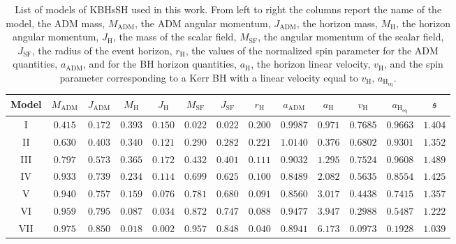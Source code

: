 \documentclass[twocolumn,aps,showpacs,showkeys,prd,superscriptaddress,byrevtex, amsmath]{revtex4-1}
\begin{document}
\begin{table}
\caption{List of models of KBHsSH used in this work. From left to right the columns report the name of the model, the ADM mass, $M_{\mathrm{ADM}}$, the ADM angular momentum, $J_{\mathrm{ADM}}$, the horizon mass, $M_{\mathrm{H}}$, the horizon angular momentum, $J_{\mathrm{H}}$, the mass of the scalar field, $M_{\mathrm{SF}}$, the angular momentum of the scalar field, $J_{\mathrm{SF}}$, the radius of the event horizon, $r_{\mathrm{H}}$, the values of the normalized spin parameter for the ADM quantities, $a_{\mathrm{ADM}}$, and for the BH horizon quantities, $a_{\mathrm{H}}$, the horizon linear velocity, $v_{\mathrm{H}}$, and the spin parameter corresponding to a Kerr BH with a linear velocity equal to $v_{\mathrm{H}}$, $a_{\mathrm{H_{eq}}}$. }        
\label{models_list}      
\centering          
\begin{tabular}{c c c c  c c c c   c c c c c}
\hline\hline       
 Model & $M_{\mathrm{ADM}}$ & $J_{\mathrm{ADM}}$ & $M_{\mathrm{H}}$ &  $J_{\mathrm{H}}$ & $M_{\mathrm{SF}}$ & $J_{\mathrm{SF}}$ & $r_{\mathrm{H}}$ & $a_{\mathrm{ADM}}$ & $a_{\mathrm{H}}$ & $v_{\mathrm{H}}$ & $a_{\mathrm{H_{eq}}}$ & $\mathfrak{s}$\\ 
\hline           
I & $0.415$ & $0.172$ & $0.393$ &  $0.150$  & $0.022$ & $0.022$ & $0.200$ & $0.9987$ & $0.971$ & $0.7685$ & $0.9663$ & $1.404$\\ 
 \hline 
II & $0.630$ & $0.403$ & $0.340$ &  $0.121$  & $0.290$ & $0.282$ & $0.221$ & $1.0140$ & $0.376$ & $0.6802$ & $0.9301$ & $1.352$ \\
 \hline 
III & $0.797$ & $0.573$ & $0.365$ &  $0.172$  & $0.432$ & $0.401$ & $0.111$ & $0.9032$ & $1.295$ & $0.7524$ & $0.9608$ & $1.489$ \\ 
 \hline 
IV & $0.933$ & $0.739$ & $0.234$ &  $0.114$  & $0.699$ & $0.625$ & $0.100$ & $0.8489$ & $2.082$ & $0.5635$ & $0.8554$ & $1.425$ \\ 
 \hline 
V & $0.940$ & $0.757$ & $0.159$ &  $0.076$  & $0.781$ & $0.680$ & $0.091$ & $0.8560$ & $3.017$ & $0.4438$ & $0.7415$ & $1.357$ \\ 
 \hline 
VI & $0.959$ & $0.795$ & $0.087$ &  $0.034$  & $0.872$ & $0.747$ & $0.088$ & $0.9477$ & $3.947$ & $0.2988$ & $0.5487$ & $1.222$ \\ 
 \hline 
VII & $0.975$ & $0.850$ & $0.018$ &  $0.002$  & $0.957$ & $0.848$ & $0.040$ & $0.8941$ & $6.173$ & $0.0973$ & $0.1928$ & $1.039$ \\ 
\hline      
\end{tabular}
\end{table}
\end{document}
